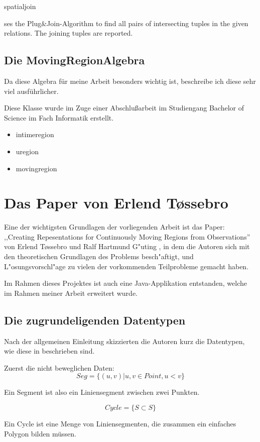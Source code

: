 spatialjoin

 ses the Plug\&Join-Algorithm to find all pairs of intersecting
           tuples in the given relations. The joining tuples are reported.
           
\subsection{Die MovingRegionAlgebra}
Da diese Algebra für meine Arbeit besonders wichtig ist, beschreibe ich diese sehr viel ausführlicher.

Diese Klasse wurde im Zuge einer Abschlußarbeit \cite{Mue} im Studiengang Bachelor of Science im Fach Informatik  erstellt.

\begin{itemize}
\item intimeregion
\item uregion
\item movingregion
\end{itemize}
 
\section{Das Paper von Erlend T\o{}ssebro }\label{Tossebro}

Eine der wichtigsten Grundlagen der vorliegenden Arbeit ist das Paper: ,,Creating Repesentations for Continuously Moving Regions from Observations'' \cite{TG} von Erlend T\o{}ssebro und Ralf Hartmund G"uting \cite{TG}, in dem die Autoren sich mit den theoretischen Grundlagen des Problems besch"aftigt, und L"osungsvorschl"age zu vielen der vorkommenden Teilprobleme gemacht haben.

Im Rahmen dieses Projektes ist auch eine Java-Applikation entstanden, welche im Rahmen meiner Arbeit erweitert wurde.

\subsection{Die zugrundeligenden Datentypen}
Nach der allgemeinen Einleitung skizzierten die Autoren kurz die Datentypen, wie diese in \cite{FGNS} beschrieben sind.

Zuerst die nicht beweglichen Daten:
$$Seg=\{(u,v)|u,v\in Point, u<v\}$$

Ein Segment ist also ein Liniensegment zwischen zwei Punkten. 

$$Cycle=\{S\subset S\}$$

Ein Cycle ist eine Menge von Liniensegmenten, die zusammen ein einfaches Polygon bilden müssen.

